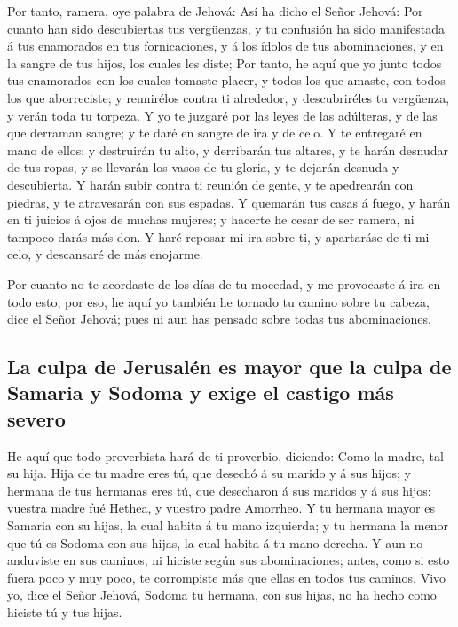  Por tanto, ramera, oye palabra de Jehová: 
Así ha dicho el Señor Jehová: Por cuanto han sido descubiertas tus
vergüenzas, y tu confusión ha sido manifestada á tus enamorados en tus
fornicaciones, y á los ídolos de tus abominaciones, y en la sangre de
tus hijos, los cuales les diste;  Por tanto, he aquí que yo
junto todos tus enamorados con los cuales tomaste placer, y todos los
que amaste, con todos los que aborreciste; y reunirélos contra ti
alrededor, y descubriréles tu vergüenza, y verán toda tu torpeza.
 Y yo te juzgaré por las leyes de las adúlteras, y de las
que derraman sangre; y te daré en sangre de ira y de celo. 
Y te entregaré en mano de ellos: y destruirán tu alto, y derribarán tus
altares, y te harán desnudar de tus ropas, y se llevarán los vasos de tu
gloria, y te dejarán desnuda y descubierta.  Y harán subir
contra ti reunión de gente, y te apedrearán con piedras, y te
atravesarán con sus espadas.  Y quemarán tus casas á fuego,
y harán en ti juicios á ojos de muchas mujeres; y hacerte he cesar de
ser ramera, ni tampoco darás más don.  Y haré reposar mi
ira sobre ti, y apartaráse de ti mi celo, y descansaré de más enojarme.

 Por cuanto no te acordaste de los días de tu mocedad, y me
provocaste á ira en todo esto, por eso, he aquí yo también he tornado tu
camino sobre tu cabeza, dice el Señor Jehová; pues ni aun has pensado
sobre todas tus abominaciones.

\hypertarget{la-culpa-de-jerusaluxe9n-es-mayor-que-la-culpa-de-samaria-y-sodoma-y-exige-el-castigo-muxe1s-severo}{%
\subsection{La culpa de Jerusalén es mayor que la culpa de Samaria y
Sodoma y exige el castigo más
severo}\label{la-culpa-de-jerusaluxe9n-es-mayor-que-la-culpa-de-samaria-y-sodoma-y-exige-el-castigo-muxe1s-severo}}

 He aquí que todo proverbista hará de ti proverbio,
diciendo: Como la madre, tal su hija.  Hija de tu madre
eres tú, que desechó á su marido y á sus hijos; y hermana de tus
hermanas eres tú, que desecharon á sus maridos y á sus hijos: vuestra
madre fué Hethea, y vuestro padre Amorrheo.  Y tu hermana
mayor es Samaria con su hijas, la cual habita á tu mano izquierda; y tu
hermana la menor que tú es Sodoma con sus hijas, la cual habita á tu
mano derecha.  Y aun no anduviste en sus caminos, ni
hiciste según sus abominaciones; antes, como si esto fuera poco y muy
poco, te corrompiste más que ellas en todos tus caminos. 
Vivo yo, dice el Señor Jehová, Sodoma tu hermana, con sus hijas, no ha
hecho como hiciste tú y tus hijas.

